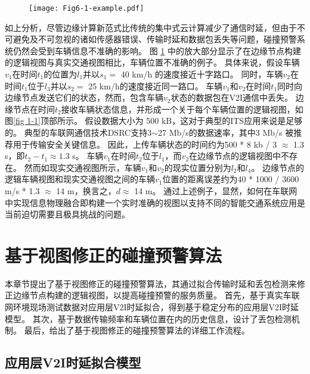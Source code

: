 \begin{figure}[h]
	\centering
	\texttt{[image: Fig6-1-example.pdf]}
	\label{fig 6-1}
\end{figure}

如上分析，尽管边缘计算新范式比传统的集中式云计算减少了通信时延，但由于不可避免及不可忽视的诸如传感器错误、传输时延和数据包丢失等问题，碰撞预警系统仍然会受到车辆信息不准确的影响。
图 \ref{fig 6-1} 中的放大部分显示了在边缘节点构建的逻辑视图与真实交通视图相比，车辆位置不准确的例子。
具体来说，假设车辆$v_1$在时间$t_1$的位置为$l_1$并以$s_1 =$ 40 km/h 的速度接近十字路口。
同时，车辆$v_2$在时间$t_1$位于$l_3$并以$s_2=$ 25 km/h的速度接近同一路口。
车辆$v_1$和$v_2$在时间$t_1$同时向边缘节点发送它们的状态，然而，包含车辆$v_2$状态的数据包在V2I通信中丢失。
边缘节点在时间$t_2$接收车辆状态信息，并形成一个关于每个车辆位置的逻辑视图，如图\ref{fig 1-1}顶部所示。
假设数据大小为 500 kB，这对于典型的ITS应用来说是足够的\cite{liu2013improving}。
典型的车联网通信技术DSRC支持3$\sim$27 Mb/s的数据速率，其中3 Mb/s 被推荐用于传输安全关键信息\cite{kenney2011dedicated}。
因此，上传车辆状态的时间约为500 * 8 kb / 3 $\approx$ 1.3 s，即${t_2} - {t_1} \approx 1.3$ s。
车辆$v_1$在时间$t_2$位于$l_1$，而$v_2$在边缘节点的逻辑视图中不存在。
然而如现实交通视图所示，车辆$v_1$和$v_2$的现实位置分别为$l_2$和$l_4$。
边缘节点的逻辑车辆视图和现实交通视图之间的车辆$v_1$位置的距离误差约为40 * 1000 / 3600 m/s * 1.3 $\approx$ 14 m，换言之，$d \approx$ 14 m。
通过上述例子，显然，如何在车联网中实现信息物理融合即构建一个实时准确的视图以支持不同的智能交通系统应用是当前迫切需要且极具挑战的问题。

\section{基于视图修正的碰撞预警算法}\label{section 6-3}

本章节提出了基于视图修正的碰撞预警算法，其通过拟合传输时延和丢包检测来修正边缘节点构建的逻辑视图，以提高碰撞预警的服务质量。
首先，基于真实车联网环境现场测试数据对应用层V2I时延拟合，得到基于稳定分布的应用层V2I时延模型。
其次，基于数据传输频率和车辆位置在内的历史信息，设计了丢包检测机制。
最后，给出了基于视图修正的碰撞预警算法的详细工作流程。

\subsection{应用层V2I时延拟合模型}

